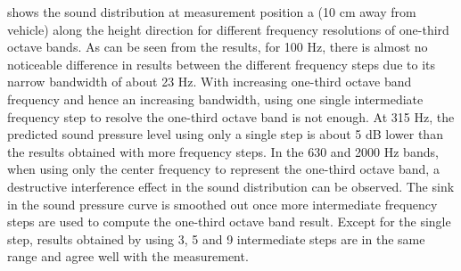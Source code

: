 \noindent{} shows the sound distribution at measurement position a (10 cm away from vehicle) along the height direction for different frequency resolutions of one-third octave bands. As can be seen from the results, for 100 Hz, there is almost no noticeable difference in results between the different frequency steps due to its narrow bandwidth of about 23 Hz. With increasing one-third octave band frequency and hence an increasing bandwidth, using one single intermediate frequency step to resolve the one-third octave band is not enough. At 315 Hz, the predicted sound pressure level using only a single step is about 5 dB lower than the results obtained with more frequency steps. In the 630 and 2000 Hz bands, when using only the center frequency to represent the one-third octave band, a destructive interference effect in the sound distribution can be observed. The sink in the sound pressure curve is smoothed out once more intermediate frequency steps are used to compute the one-third octave band result. Except for the single step, results obtained by using 3, 5 and 9 intermediate steps are in the same range and agree well with the measurement.

